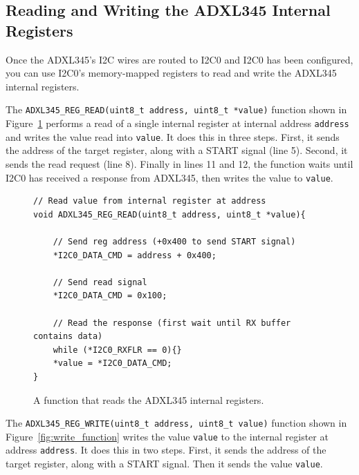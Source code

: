 \documentclass[11pt, twoside, pdftex]{article}
\begin{document}
\pagebreak
\subsection{Reading and Writing the ADXL345 Internal Registers}

Once the ADXL345's I2C wires are routed to I2C0 and I2C0 has been configured, you can use I2C0's memory-mapped registers to read and write the ADXL345 internal registers. %

The \texttt{ADXL345\_REG\_READ(uint8\_t address, uint8\_t *value)} function shown in Figure~\ref{fig:read_function} performs a read of a single internal register at internal address \texttt{address} and writes the value read into \texttt{value}. It does this in three steps. First, it sends the address of the target register, along with a START signal (line 5). Second, it sends the read request (line 8). Finally in lines 11 and 12, the function waits until I2C0 has received a response from ADXL345, then writes the value to \texttt{value}.

\begin{figure}[H]
\begin{center}
\begin{minipage}[t]{16 cm}
\begin{lstlisting}
// Read value from internal register at address
void ADXL345_REG_READ(uint8_t address, uint8_t *value){

    // Send reg address (+0x400 to send START signal)
    *I2C0_DATA_CMD = address + 0x400;
    
    // Send read signal
    *I2C0_DATA_CMD = 0x100;
    
    // Read the response (first wait until RX buffer contains data)  
    while (*I2C0_RXFLR == 0){}
    *value = *I2C0_DATA_CMD;
}
\end{lstlisting}
\end{minipage}
\end{center}
\vspace{-0.33in}\caption{A function that reads the ADXL345 internal registers.}
\label{fig:read_function}
\end{figure}

The \texttt{ADXL345\_REG\_WRITE(uint8\_t address, uint8\_t value)} function shown in Figure~\ref{fig:write_function} writes the value \texttt{value} to the internal register at address \texttt{address}. It does this in two steps. First, it sends the address of the target register, along with a START signal. Then it sends the value \texttt{value}.
\end{document}
